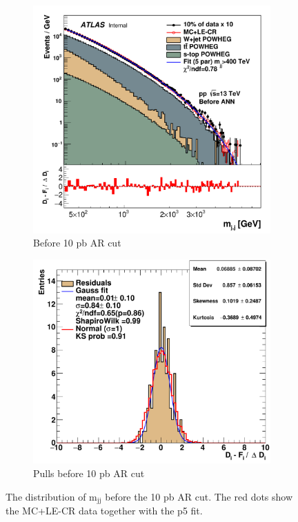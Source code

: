\begin{figure}[ht]
    \centering
    \begin{subfigure}[h]{0.4\linewidth}
    \includegraphics[scale=0.32]{figs/ch6/fit/mass_jj_mcCR_before_scale.pdf}%
    \caption{Before 10 pb AR cut}
    \end{subfigure}
    \hfill
    \begin{subfigure}[h]{0.45\linewidth}
    \includegraphics[scale=0.35]{figs/ch6/fit/mass_jj_mcCR_before_scale_residuals.pdf}%
    \caption{Pulls before 10 pb AR cut}
    \end{subfigure}
    \hfill
    \caption{The distribution of $\textrm{m}_{\textrm{jj}}$ before the 10 pb AR cut. The red dots show the MC+LE-CR data together with the p5 fit. }
\label{fig:mjj-fit-data}
\end{figure}

